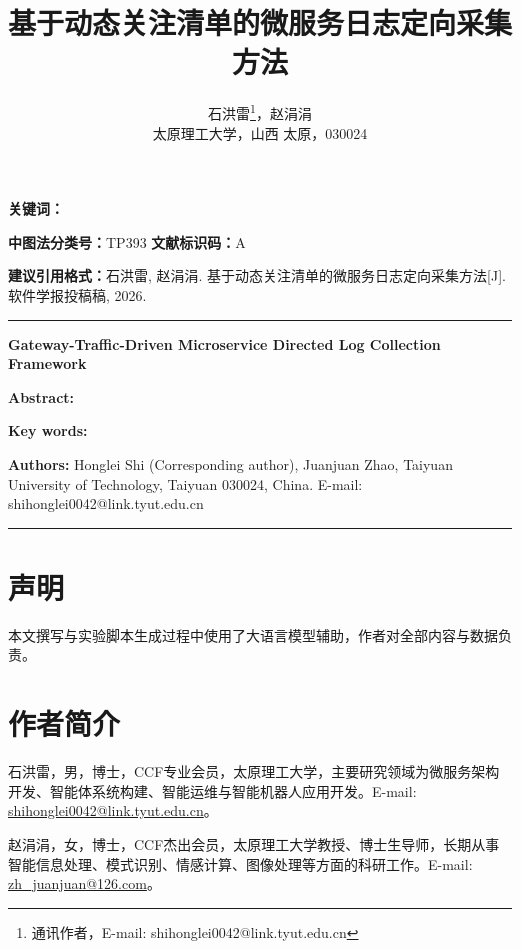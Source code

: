 \documentclass[12pt,a4paper]{ctexart}
\title{基于动态关注清单的微服务日志定向采集方法}
\author{石洪雷\thanks{通讯作者，E-mail: shihonglei0042@link.tyut.edu.cn}，赵涓涓\\
\small 太原理工大学，山西 太原，030024}
\date{}
\begin{document}
\maketitle



\begin{abstract}
\AbstractContentZh
\end{abstract}

\noindent\textbf{关键词：}\KeywordsZh

\noindent\textbf{中图法分类号：}TP393 \quad \textbf{文献标识码：}A

\vspace{0.4em}
\noindent\textbf{建议引用格式：}石洪雷, 赵涓涓. 基于动态关注清单的微服务日志定向采集方法[J]. 软件学报投稿稿, 2026.

\vspace{1em}
\hrule
\vspace{0.8em}

{\centering\bfseries Gateway-Traffic-Driven Microservice Directed Log Collection Framework\par}
\vspace{0.6em}

\noindent\textbf{Abstract:}
\AbstractContentEn

\vspace{0.5em}
\noindent\textbf{Key words:} \KeywordsEn

\vspace{0.4em}
\noindent\textbf{Authors:} Honglei Shi (Corresponding author), Juanjuan Zhao, Taiyuan University of Technology, Taiyuan 030024, China. E-mail: shihonglei0042@link.tyut.edu.cn

\vspace{1em}
\hrule
\vspace{1em}









\section*{声明}
本文撰写与实验脚本生成过程中使用了大语言模型辅助，作者对全部内容与数据负责。




\section*{作者简介}
石洪雷，男，博士，CCF专业会员，太原理工大学，主要研究领域为微服务架构开发、智能体系统构建、智能运维与智能机器人应用开发。E-mail: \url{shihonglei0042@link.tyut.edu.cn}。

赵涓涓，女，博士，CCF杰出会员，太原理工大学教授、博士生导师，长期从事智能信息处理、模式识别、情感计算、图像处理等方面的科研工作。E-mail: \url{zh_juanjuan@126.com}。
\end{document}
